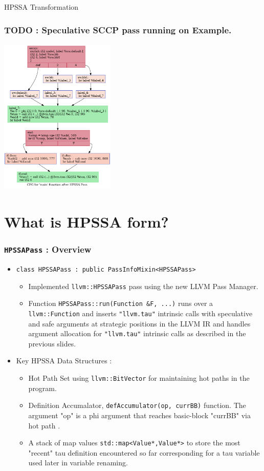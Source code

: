 \documentclass{beamer}
\begin{document}
\begin{frame}{HPSSA Transformation}
	\frametitle{TODO : Speculative SCCP pass running on Example.}
	\centering
	\includegraphics[width=5.5cm,height=7.5cm]{afterHPSSA.dot.png}
\end{frame}

\section{What is HPSSA form?}
\footnotesize
\begin{frame}
	\frametitle{\texttt{HPSSAPass} : Overview}
	\begin{itemize}
		\item \texttt{class HPSSAPass : public PassInfoMixin<HPSSAPass>}
		\begin{itemize}
			\footnotesize
			\item Implemented \texttt{llvm::HPSSAPass} pass using the new LLVM Pass Manager. 
			\item Function \texttt{HPSSAPass::run(Function \&F, ...)}  runs over a \texttt{llvm::Function} and inserts \texttt{"llvm.tau"} intrinsic calls with speculative and safe arguments at strategic positions in the LLVM IR and handles argument allocation for  \texttt{"llvm.tau"} intrinsic calls as described in the previous slides.
		\end{itemize}
		\item Key HPSSA Data Structures :  
		\begin{itemize}
			\footnotesize
			\item Hot Path Set using \texttt{llvm::BitVector} for maintaining \color{red} hot paths \color{black} in the program.
			\item Definition Accumalator, \texttt{defAccumulator(op, currBB)} function. %
			The argument "op" is a phi argument that reaches basic-block "currBB" via \color{red} hot path \color{black}. 
			\item A stack of map values \texttt{std::map<Value*,Value*>} to store the most "recent" tau definition encountered so far corresponding for a tau variable used later in variable renaming. 
		\end{itemize}
	\end{itemize}
\end{frame}
\end{document}
